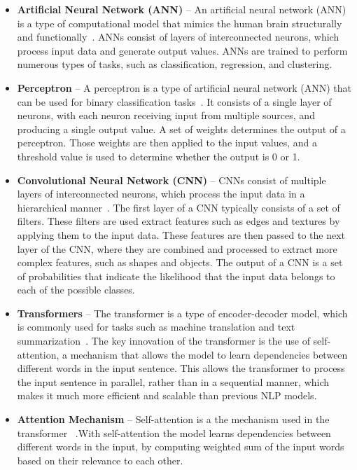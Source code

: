 \documentclass[runningheads]{llncs}
\begin{document}
\begin{itemize}

\item   \textbf{Artificial Neural Network (ANN)} – An artificial 
            neural network (ANN) is a type of computational model that mimics the human brain structurally and functionally~\cite{zupan1994introduction}. ANNs consist of layers of interconnected 
            neurons, which process input data and generate output 
            values. ANNs are trained to perform numerous types 
            of tasks, such as classification, regression, and clustering.

\item \textbf{Perceptron} – A perceptron is a type of artificial 
    neural network (ANN) that can be used for binary classification 
    tasks~\cite{gallant1990perceptron}. It consists of a single layer of neurons, with each neuron receiving input from multiple sources, and producing a single output value. A set of weights determines the output of a perceptron. Those weights are then applied to the input values, and a threshold value is used to determine whether the output is 0 or 1. 

\item \textbf{Convolutional Neural Network (CNN)} – CNNs 
    consist of multiple layers of interconnected neurons, which process 
    the input data in a hierarchical manner~\cite{DBLP:journals/corr/OSheaN15}. The first layer of a CNN typically consists of a set of filters. These filters are used extract features such as edges and textures by applying them to the input data. These features are then passed to the next layer of the CNN, where 
    they are combined and processed to extract more complex features, 
    such as shapes and objects. The output of a CNN is a set of 
    probabilities that indicate the likelihood that the input data 
    belongs to each of the possible classes.  
    
\item \textbf{Transformers} – The transformer is a type of encoder-decoder model, which is commonly used 
    for tasks such as machine translation and text summarization~\cite{vaswani2017attention}. 
    The key innovation of the transformer is the use of self-attention, 
    a mechanism that allows the model to learn dependencies 
    between different words in the input sentence. This allows 
    the transformer to process the input sentence in parallel, 
    rather than in a sequential manner, which makes it much 
    more efficient and scalable than previous NLP models.

\item \textbf{Attention Mechanism} – Self-attention is a 
    the mechanism used in the transformer ~\cite{vaswani2017attention}.With self-attention the model learns dependencies between different 
    words in the input, by computing weighted sum of the input 
    words based on their relevance to each other.

\end{itemize}
\end{document}
